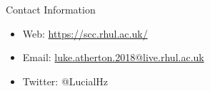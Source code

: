 \documentclass[final]{beamer}
\newlength{\onecolwid}
\begin{document}
\begin{frame}[t]
\begin{columns}[t]
\begin{column}{\onecolwid}
\begin{alertblock}{Contact Information}

\begin{itemize}
\item Web: \href{https://scc.rhul.ac.uk/}{https://scc.rhul.ac.uk/}
\item Email: \href{luke.atherton.2018@live.rhul.ac.uk}{luke.atherton.2018@live.rhul.ac.uk}
\item Twitter: @LucialHz
\end{itemize}

\end{alertblock}


\end{column} %

\end{columns} %

\end{frame} %
\end{document}
